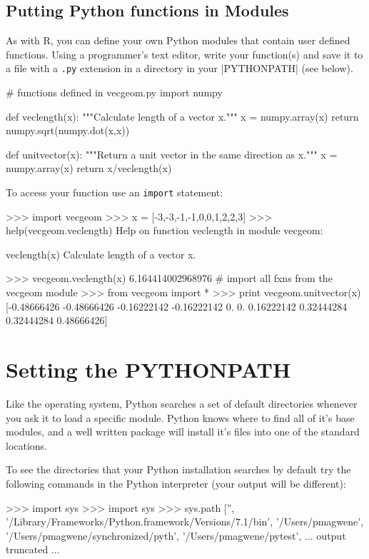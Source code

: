 \subsection{Putting Python functions in Modules}

As with R, you can define your own Python modules that contain user
defined functions. Using a programmer's text editor, write your
function(s) and save it to a file with a \lstinline!.py! extension in a
directory in your |PYTHONPATH| (see below).

\begin{python}
# functions defined in vecgeom.py
import numpy

def veclength(x):
    """Calculate length of a vector x.""" 
    x = numpy.array(x)
    return numpy.sqrt(numpy.dot(x,x))

def unitvector(x):
    """Return a unit vector in the same direction as x."""
    x = numpy.array(x)
    return x/veclength(x)
\end{python}
%
To access your function use an \lstinline!import! statement:
%
\begin{python}
>>> import vecgeom
>>> x = [-3,-3,-1,-1,0,0,1,2,2,3]
>>> help(vecgeom.veclength)
Help on function veclength in module vecgeom:

veclength(x)
    Calculate length of a vector x.

>>> vecgeom.veclength(x)
6.164414002968976
# import all fxns from the vecgeom module
>>> from vecgeom import * 
>>> print vecgeom.unitvector(x)
[-0.48666426 -0.48666426 -0.16222142 -0.16222142  0.          0.   
     0.16222142  0.32444284  0.32444284  0.48666426]
\end{python}



\section{Setting the PYTHONPATH}

Like the operating system, Python searches a set of default directories whenever you ask it to load a specific module.  Python knows where to find all of it's base modules, and a well written package will install it's files into one of the standard locations.

To see the directories that your Python installation searches by default try the following commands in the Python interpreter (your output will be different):
%
\begin{python}
>>> import sys
>>> import sys
>>> sys.path
['', '/Library/Frameworks/Python.framework/Versions/7.1/bin', '/Users/pmagwene', 
'/Users/pmagwene/synchronized/pyth', '/Users/pmagwene/pytest', 
... output truncated ...
\end{python}

